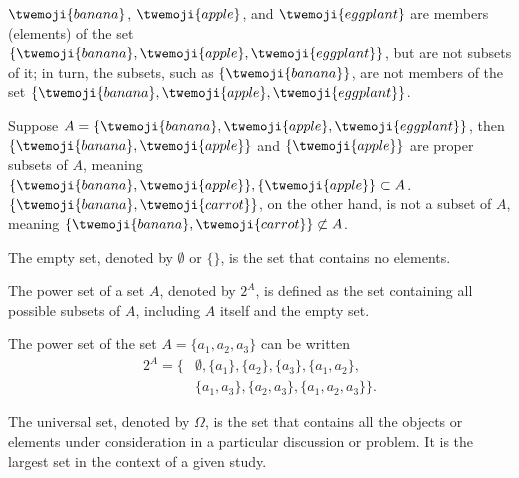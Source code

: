 \begin{example}
	$\twemoji{banana}$, $\twemoji{apple}$, and $\twemoji{eggplant}$ are members (elements) of the set $\{\twemoji{banana}, \twemoji{apple}, \twemoji{eggplant}\}$, but are not subsets of it; in turn, the subsets, such as $\{\twemoji{banana}\}$, are not members of the set $\{\twemoji{banana}, \twemoji{apple}, \twemoji{eggplant}\}$.
\end{example}

\begin{example}
	Suppose $A = \{\twemoji{banana}, \twemoji{apple}, \twemoji{eggplant}\}$, then $\{\twemoji{banana}, \twemoji{apple}\}$ and $\{\twemoji{apple}\}$ are proper subsets of $A$, meaning $\{\twemoji{banana}, \twemoji{apple}\},\{\twemoji{apple}\}\subset  A$. $\{\twemoji{banana}, \twemoji{carrot}\}$, on the other hand, is not a subset of $A$, meaning $\{\twemoji{banana}, \twemoji{carrot}\}\not\subset  A$.
\end{example}

\begin{definition}
	The empty set, denoted by $\emptyset$ or $\{\}$, is the set that contains no elements.
\end{definition}

\begin{definition}
	\label{def:power_set}
	The power set of a set $A$, denoted by $2^A$, is defined as the set containing all possible subsets of $A$, including $A$ itself and the empty set.
\end{definition}

\begin{example}
	The power set of the set $A = \{a_1,a_2,a_3\}$ can be written
	\begin{equation}
		\begin{split}
			2^A = \{&\emptyset, \{a_1\}, \{a_2\}, \{a_3\}, \{a_1, a_2\},\\
			& \{a_1, a_3\}, \{a_2, a_3\}, \{a_1, a_2, a_3\}\}.
		\end{split}
	\end{equation}
\end{example}

\begin{definition}
	The universal set, denoted by $\Omega$, is the set that contains all the objects or elements under consideration in a particular discussion or problem. It is the largest set in the context of a given study.
\end{definition}

